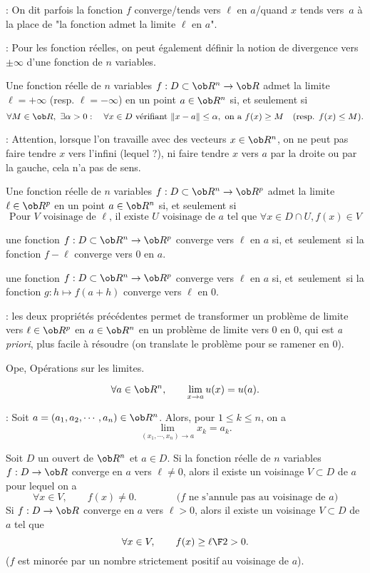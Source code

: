 \Remarque : On dit parfois la fonction $f$ converge/tends vers $\ell$ en $a$/quand $x$ tends vers~$a$ \`a la place de "la fonction admet la limite $\ell$ en $a$". 
\bigskip


\Remarque : Pour les fonction r\'eelles, on peut \'egalement d\'efinir la notion de divergence vers $\pm\infty$ d'une fonction de $n$ variables. 
\bigskip

\Definition []  Une fonction r\'eelle de $n$ variables $f:D\subset\ob R^n\to \ob R$ admet la limite $\ell=+\infty$ (resp. $\ell=-\infty$) en un point $a\in\ob R^n$ si, et seulement si 
$$
\forall M\in\ob R, \ \exists \alpha>0:\quad \forall x\in D\mbox{ v\'erifiant } \|x-a\|\le \alpha, \mbox{ on a } f(x)\ge M\quad(\mbox{resp. }f(x)\le M).
$$

\Remarque : Attention, lorsque l'on travaille avec des vecteurs $x\in\ob R^n$, on ne peut pas faire tendre $x$ vers l'infini (lequel ?), ni faire tendre $x$ vers $a$ par la droite ou par la gauche, cela n'a pas de sens. 
\bigskip


\Propriete []  Une fonction r\'eelle de $n$ variables $f:D\subset\ob R^n\to \ob R^p$ admet la limite $\ell\in\ob R^p$ en un point $a\in\ob R^n$ si, et seulement si 
$$
{
\mbox{Pour $V$ voisinage de $\ell$, il existe $U$ voisinage de $a$ tel que }\forall x\in D\cap U, f(x)\in V}
$$


\Propriete []  une fonction $f:D\subset\ob R^n\to\ob R^p$ converge vers $\ell$ en $a$ si, 
et~seulement~si la fonction $f-\ell$ converge vers $0$ en $a$. 


\Propriete []  une fonction $f:D\subset\ob R^n\to\ob R^p$ converge vers $\ell$ en $a$ si, et~seulement~si la fonction $g:h\mapsto f(a+h)$ converge vers $\ell$ en $0$. 

\Remarque : les deux propri\'et\'es pr\'ec\'edentes permet de transformer un probl\`eme de limite vers $\ell\in\ob R^p$ en $a\in\ob R^n$ 
en un probl\`eme de limite vers $0$ en $0$, qui est {\it a priori}, plus facile \`a r\'esoudre (on translate le probl\`eme pour se ramener en $0$). 
\bigskip


\Subsection Ope, Op\'erations sur les limites. 

$$
\forall a\in\ob R^n, \qquad \lim_{x\to a}u(x)=u(a). 
$$

\Remarque : Soit $a=(a_1,a_2,\cdots,a_n)\in\ob R^n$. Alors, pour $1\le k\le n$, on a 
$$
\lim_{(x_1,\cdots,x_n)\to a}x_k=a_k. 
$$

\Propriete []  Soit $D$ un ouvert de $\ob R^n$ et $a\in D$. Si la fonction r\'eelle de $n$ variables $f:D\to\ob R$ converge en $a$ vers $\ell\neq 0$, 
alors il existe un voisinage $V\subset D$ de $a$ pour lequel on a 
$$
\forall x\in V,\qquad f(x)\neq0.\qquad\qquad \mbox{($f$ ne s'annule pas au voisinage de $a$)}
$$
Si $f:D\to\ob R$ converge en $a$ vers $\ell> 0$, alors il existe un voisinage $V\subset D$ de $a$ tel que
$$
\forall x\in V,\qquad f(x)\ge{\ell\F 2}> 0. 
$$
($f$ est minor\'ee par un nombre strictement positif au voisinage de $a$). 
\bigskip


